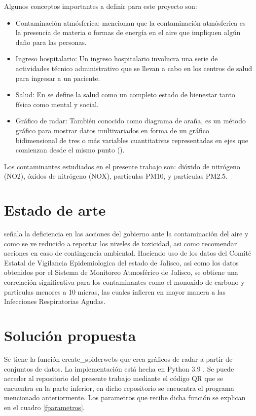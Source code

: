 \documentclass[a0]{sciposter} %
\begin{document}
\begin{multicols}{2}
Algunos conceptos importantes a definir para este proyecto son:  
\begin{itemize}
    \item Contaminación atmósferica: \citet{bib4} mencionan que la contaminación atmósferica es la presencia de materia o formas de energía en el aire que impliquen algún daño para las personas.
    \item Ingreso hospitalario: Un ingreso hospitalario involucra una serie de actividades técnico administrativo que se llevan a cabo en los centros de salud para ingresar a un paciente.
    \item Salud: En \citet{bib3} se define la salud como un completo estado de bienestar tanto físico como mental y social.
    \item Gráfico de radar: También conocido como diagrama de araña, es un método gráfico para mostrar datos multivariados en forma de un gráfico bidimensional de tres o más variables cuantitativas representadas en ejes que comienzan desde el mismo punto (\citet{bib5}).  
\end{itemize}
 Los contaminantes estudiados en el presente trabajo son: dióxido de nitrógeno (NO2), óxidos de nitrógeno (NOX), partículas PM10, y partículas PM2.5.


\section{Estado de arte}

\citet{bib1} señala la deficiencia en las acciones del gobierno ante la contaminación del aire y como se ve reducido a reportar los niveles de toxicidad, asi como recomendar acciones en caso de contingencia ambiental. Haciendo uso de los datos del Comité Estatal de Vigilancia Epidemiologica del estado de Jalisco, asi como los datos obtenidos por el Sistema de Monitoreo Atmosférico de Jalisco, se obtiene una correlación significativa para los contaminantes como el monoxido de carbono y particulas menores a 10 micras, las cuales infieren en mayor manera a las Infecciones Respiratorias Agudas. 

\section{Solución propuesta}

Se tiene la función create\_spiderwebs que crea gráficos de radar a partir de conjuntos de datos. 
La implementación está hecha en Python 3.9 \citep{python}. Se puede acceder al repositorio del presente trabajo mediante el código QR que se encuentra en la parte inferior, en dicho repositorio se encuentra el programa mencionado anteriormente. Los parametros que recibe dicha función se explican en el cuadro \ref{fparametros}. 


\end{multicols}
\end{document}
